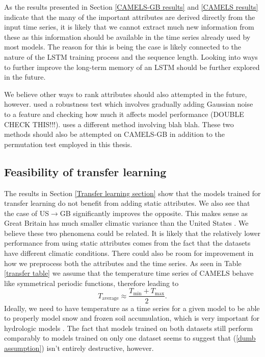 As the results presented in Section \ref{CAMELS-GB results} and \ref{CAMELS results} 
indicate that the many of the important attributes are derived directly from the 
input time series, it is likely that we cannot extract much new information from 
these as this information should be available in the time series already used by 
most models. The reason for this is being the case is likely connected to the 
nature of the LSTM training process and the sequence length. Looking into ways 
to further improve the long-term memory of an LSTM should be further explored 
in the future.

We believe other ways to rank attributes should also attempted 
in the future, however. \citet{lstm_second_paper} used a robustness test which 
involves gradually adding Gaussian noise to a feature and checking how much it 
affects model performance (DOUBLE CHECK THIS!!!). \citet{OrigCAMELSRanking} 
uses a different method involving blah blah. These two methods should also be 
attempted on CAMELS-GB in addition to the permutation test employed in this 
thesis.



\subsection{Feasibility of transfer learning}
The results in Section \ref{Transfer learning section} show that the models trained 
for transfer learning do not benefit from adding static attributes. We also see 
that the case of US$\rightarrow$GB significantly improves the opposite. This makes 
sense as Great Britain has much smaller climatic variance than the United States 
\citationneeded. We believe these two phenomena could be related. It is likely 
that the relatively lower performance from using static attributes comes from the 
fact that the datasets have different climatic conditions. There could also be 
room for improvement in how we preprocess both the attributes and the time series. 
As seen in Table \ref{transfer table} we assume that the temperature time series 
of CAMELS behave like symmetrical periodic functions, therefore leading to 
\begin{equation}
T_\text{average} \approx  \frac{T_\text{min}+T_\text{max}}{2}. \label{dumb assumption}
\end{equation}
Ideally, we need to have temperature as a time series for a given model to be able 
to properly model snow and frozen soil accumulation, which is very important for 
hydrologic models \citationneeded. The fact that models trained on both datasets 
still perform comparably to models trained on only one dataset seems to suggest 
that (\ref{dumb assumption}) isn't entirely destructive, however.

